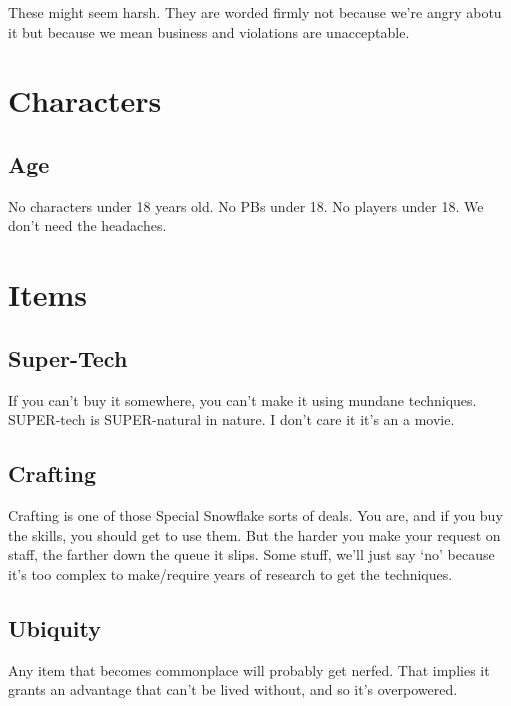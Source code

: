 These might seem harsh. 
They are worded firmly not because we're angry abotu it but because we mean business and violations are unacceptable.
\section{Characters}
\subsection{Age}
No characters under 18 years old.
No PBs under 18.
No players under 18.
We don't need the headaches.
\section{Items}
\subsection{Super-Tech}
If you can't buy it somewhere, you can't make it using mundane techniques.
SUPER-tech is SUPER-natural in nature.
I don't care it it's an a movie.

\subsection{Crafting}
Crafting is one of those Special Snowflake sorts of deals. You are, and if
you buy the skills, you should get to use them. But the harder you make
your request on staff, the farther down the queue it slips. Some stuff,
we'll just say `no' because it's too complex to make/require
years of research to get the techniques.
\subsection{Ubiquity}
Any item that becomes commonplace will probably get nerfed. That implies
it grants an advantage that can't  be lived without, and so it's
overpowered.
